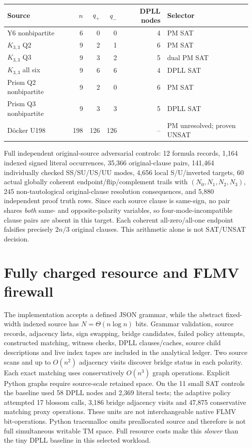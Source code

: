 \documentclass[11pt]{article}
\begin{document}
\begin{center}\begin{tabular}{lrrrrl}\toprule
Source & $n$ & $q_+$ & $q_-$ & DPLL nodes & Selector\\\midrule
Y6 nonbipartite & 6 &0&0&4&PM SAT\\
$K_{3,3}$ Q2 &9&2&1&6&PM SAT\\
$K_{3,3}$ Q3 &9&3&2&5&dual PM SAT\\
$K_{3,3}$ all six &9&6&6&4&DPLL SAT\\
Prism Q2 nonbipartite &9&2&0&6&PM SAT\\
Prism Q3 nonbipartite &9&3&3&5&DPLL SAT\\
D\"ocker U198 &198&126&126&--&PM unresolved; proven UNSAT\\\bottomrule
\end{tabular}\end{center}

Full independent original-source adversarial controls: 12 formula records, 1,164 indexed signed literal occurrences, 35,366 original-clause pairs, 141,464 individually checked SS/SU/US/UU modes, 4,656 local S/U/inverted targets, 60 actual globally coherent endpoint/flip/complement trails with $(N_0,N_1,N_2,N_3)$, 245 non-tautological original-clause resolution consequences, and 5,880 independent proof truth rows. Since each source clause is same-sign, no pair shares \emph{both} same- and opposite-polarity variables, so four-mode-incompatible clause pairs are absent in this target. Each coherent all-zero/all-one endpoint falsifies precisely $2n/3$ original clauses. This arithmetic alone is not SAT/UNSAT decision.

\section{Fully charged resource and FLMV firewall}
The implementation accepts a defined JSON grammar, while the abstract fixed-width indexed source has $N=\Theta(n\log n)$ bits. Grammar validation, source records, adjacency lists, sign swapping, bridge candidates, failed policy attempts, constructed matching, witness checks, DPLL clauses/caches, source child descriptions and live index tapes are included in the analytical ledger. Two source scans and up to $O(n^2)$ adjacency visits discover bridge status in each polarity. Each exact matching uses conservatively $O(n^3)$ graph operations. Explicit Python graphs require source-scale retained space. On the 11 small SAT controls the baseline used 58 DPLL nodes and 2,369 literal tests; the adaptive policy attempted 17 blossom calls, 3,186 bridge adjacency visits and 47,875 conservative matching proxy operations. These units are not interchangeable native FLMV bit-operations. Python tracemalloc omits preallocated source and therefore is not full simultaneous writable TM space. Full resource costs make this \emph{slower} than the tiny DPLL baseline in this selected workload.
\end{document}
